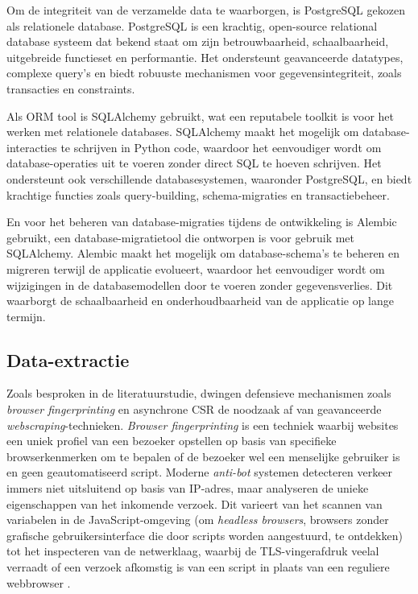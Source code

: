 Om de integriteit van de verzamelde data te waarborgen, is PostgreSQL \autocite{PostgreSQL} gekozen als relationele database. PostgreSQL is een krachtig, open-source relational database systeem dat bekend staat om zijn betrouwbaarheid, schaalbaarheid, uitgebreide functieset en performantie. 
Het ondersteunt geavanceerde datatypes, complexe query's en biedt robuuste mechanismen voor gegevensintegriteit, zoals transacties en constraints.

Als \gls{ORM} tool is SQLAlchemy \autocite{SQLAlchemy} gebruikt, wat een reputabele toolkit is voor het werken met relationele databases. 
SQLAlchemy maakt het mogelijk om database-interacties te schrijven in Python code, waardoor het eenvoudiger wordt om database-operaties uit te voeren zonder direct SQL te hoeven schrijven. 
Het ondersteunt ook verschillende databasesystemen, waaronder PostgreSQL, en biedt krachtige functies zoals query-building, schema-migraties en transactiebeheer.

En voor het beheren van database-migraties tijdens de ontwikkeling is Alembic \autocite{Alembic} gebruikt, een database-migratietool die ontworpen is voor gebruik met SQLAlchemy. 
Alembic maakt het mogelijk om database-schema's te beheren en migreren terwijl de applicatie evolueert, waardoor het eenvoudiger wordt om wijzigingen in de databasemodellen door te voeren zonder gegevensverlies. 
Dit waarborgt de schaalbaarheid en onderhoudbaarheid van de applicatie op lange termijn.

\subsection{Data-extractie}

Zoals besproken in de literatuurstudie, dwingen defensieve mechanismen zoals \textit{browser fingerprinting} en asynchrone \gls{CSR} de noodzaak af van geavanceerde \textit{webscraping}-technieken.
\textit{Browser fingerprinting} is een techniek waarbij websites een uniek profiel van een bezoeker opstellen op basis van specifieke browserkenmerken om te bepalen of de bezoeker wel een menselijke gebruiker is en geen geautomatiseerd script.
Moderne \textit{anti-bot} systemen detecteren verkeer immers niet uitsluitend op basis van IP-adres, maar analyseren de unieke eigenschappen van het inkomende verzoek. 
Dit varieert van het scannen van variabelen in de JavaScript-omgeving (om \textit{headless browsers}, browsers zonder grafische gebruikersinterface die door scripts worden aangestuurd, te ontdekken) tot het inspecteren van de netwerklaag, waarbij de TLS-vingerafdruk veelal verraadt 
of een verzoek afkomstig is van een script in plaats van een reguliere webbrowser \autocite{Tseriotis2025}.

